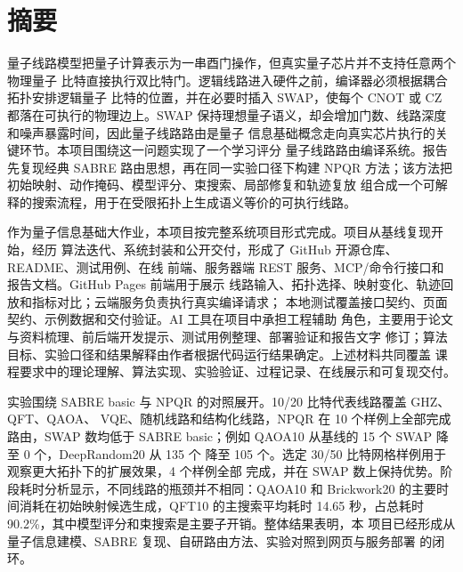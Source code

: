 \section*{摘要}

量子线路模型把量子计算表示为一串酉门操作，但真实量子芯片并不支持任意两个物理量子
比特直接执行双比特门。逻辑线路进入硬件之前，编译器必须根据耦合拓扑安排逻辑量子
比特的位置，并在必要时插入 SWAP，使每个 CNOT 或 CZ 都落在可执行的物理边上。SWAP
保持理想量子语义，却会增加门数、线路深度和噪声暴露时间，因此量子线路路由是量子
信息基础概念走向真实芯片执行的关键环节。本项目围绕这一问题实现了一个学习评分
量子线路路由编译系统。报告先复现经典 SABRE 路由思想，再在同一实验口径下构建
NPQR 方法；该方法把初始映射、动作掩码、模型评分、束搜索、局部修复和轨迹复放
组合成一个可解释的搜索流程，用于在受限拓扑上生成语义等价的可执行线路。

作为量子信息基础大作业，本项目按完整系统项目形式完成。项目从基线复现开始，经历
算法迭代、系统封装和公开交付，形成了 GitHub 开源仓库、README、测试用例、在线
前端、服务器端 REST 服务、MCP/命令行接口和报告文档。GitHub Pages 前端用于展示
线路输入、拓扑选择、映射变化、轨迹回放和指标对比；云端服务负责执行真实编译请求；
本地测试覆盖接口契约、页面契约、示例数据和交付验证。AI 工具在项目中承担工程辅助
角色，主要用于论文与资料梳理、前后端开发提示、测试用例整理、部署验证和报告文字
修订；算法目标、实验口径和结果解释由作者根据代码运行结果确定。上述材料共同覆盖
课程要求中的理论理解、算法实现、实验验证、过程记录、在线展示和可复现交付。

实验围绕 SABRE basic 与 NPQR 的对照展开。10/20 比特代表线路覆盖 GHZ、QFT、QAOA、
VQE、随机线路和结构化线路，NPQR 在 10 个样例上全部完成路由，SWAP 数均低于
SABRE basic；例如 QAOA10 从基线的 15 个 SWAP 降至 0 个，DeepRandom20 从 135 个
降至 105 个。选定 30/50 比特网格样例用于观察更大拓扑下的扩展效果，4 个样例全部
完成，并在 SWAP 数上保持优势。阶段耗时分析显示，不同线路的瓶颈并不相同：QAOA10
和 Brickwork20 的主要时间消耗在初始映射候选生成，QFT10 的主搜索平均耗时
14.65 秒，占总耗时 90.2\%，其中模型评分和束搜索是主要子开销。整体结果表明，本
项目已经形成从量子信息建模、SABRE 复现、自研路由方法、实验对照到网页与服务部署
的闭环。
